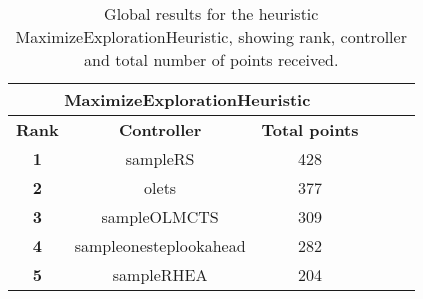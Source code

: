 \begin{table*}[!t]
\begin{center}
\begin{tabular}{|c|c|c|c|c|c|}
\multicolumn{3}{c}{\textbf{MaximizeExplorationHeuristic}}\\
\hline
\textbf{Rank} & \textbf{Controller} & \textbf{Total points}\\
\hline
\textbf{1} & sampleRS & 428
 \\
\hline
\textbf{2} & olets & 377
 \\
\hline
\textbf{3} & sampleOLMCTS & 309
 \\
\hline
\textbf{4} & sampleonesteplookahead & 282
 \\
\hline
\textbf{5} & sampleRHEA & 204
 \\
\hline
\end{tabular}
\caption{Global results for the heuristic MaximizeExplorationHeuristic, showing rank, controller and total number of points received.}
\label{tab:weights}
\end{center}
\end{table*}

